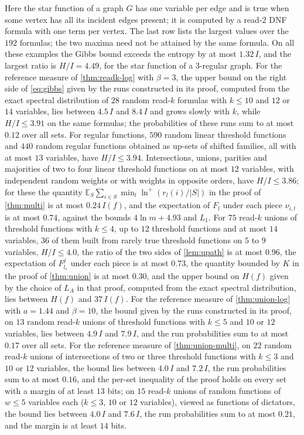 \documentclass[11pt]{amsart}
\theoremstyle{definition}
\theoremstyle{remark}
\newcommand{\E}{\mathbb{E}}
\begin{document}
\noindent Here the star function of a graph $G$ has one variable per edge and is true when some vertex has all its
incident edges present; it is computed by a read-$2$ DNF formula with one term per vertex. The last row lists the
largest values over the $192$ formulas; the two maxima need not be attained by the same formula. On all these
examples the Gibbs bound exceeds the entropy by at most $1.32\,I$, and the largest ratio is $H/I=4.49$, for the star
function of a $3$-regular graph. For the reference measure of \cref{thm:readk-log} with $\beta=3$, the upper bound on
the right side of \eqref{eq:gibbs} given by the runs constructed in its proof, computed from the exact spectral
distribution of $28$ random read-$k$ formulas with $k\le10$ and $12$ or $14$ variables, lies between $4.5\,I$ and
$8.4\,I$ and grows slowly with $k$, while $H/I\le3.91$ on the same formulas; the probabilities of these runs sum to
at most $0.12$ over all sets. For regular functions, $590$ random linear threshold functions and $440$ random
regular functions obtained as up-sets of shifted families, all with at most $13$ variables, have $H/I\le3.94$.
Intersections, unions, parities and majorities of two to four linear threshold functions on at most $12$
variables, with independent random weights or with weights in opposite orders, have $H/I\le3.86$; for these the
quantity $\E_S\sum_{i\in S}\min_l\ln^+(r_l(i)/|S|)$ in the proof of \cref{thm:multi} is at most $0.24\,I(f)$, and
the expectation of $F_l$ under each piece $\nu_{i,l}$ is at most $0.74$, against the bounds $4\ln m+4.93$ and $L_1$.
For $75$ read-$k$ unions of threshold functions with $k\le4$, up to $12$ threshold functions and at most $14$
variables, $36$ of them built from rarely true threshold functions on $5$ to $9$ variables, $H/I\le4.0$, the ratio of
the two sides of \cref{lem:upath} is at most $0.96$, the expectation of $F^j_{l_s}$ under each piece is at most $0.73$,
the quantity bounded by $K$ in the proof of \cref{thm:union} is at most $0.30$, and the upper bound on $H(f)$ given by
the choice of $L_A$ in that proof, computed from the exact spectral distribution, lies between $H(f)$ and $37\,I(f)$.
For the reference measure of \cref{thm:union-log} with $a=1.44$ and $\beta=10$, the bound given by the runs
constructed in its proof, on $13$ random read-$k$ unions of threshold functions with $k\le5$ and $10$ or $12$
variables, lies between $4.9\,I$ and $7.9\,I$, and the run probabilities sum to at most $0.17$ over all sets.
For the reference measure of \cref{thm:union-multi}, on $22$ random read-$k$ unions of intersections of two or three
threshold functions with $k\le3$ and $10$ or $12$ variables, the bound lies between $4.0\,I$ and $7.2\,I$, the run
probabilities sum to at most $0.16$, and the per-set inequality of the proof holds on every set with a margin of at
least $13$ bits; on $15$ read-$k$ unions of random functions of $w\le5$ variables each ($k\le3$, $10$ or $12$
variables), viewed as functions of dictators, the bound lies between $4.0\,I$ and $7.6\,I$, the run probabilities sum
to at most $0.21$, and the margin is at least $14$ bits.
\end{document}
